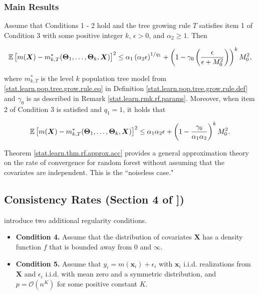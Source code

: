 \subsubsection{Main Results}

\begin{theorem}\label{stat.learn.thm.rf.approx.acc}

Assume that Conditions 1 - 2 hold and the tree growing rule \(T\) satisfies item 1 of Condition 3 with some positive integer \(k\), \(\epsilon >0\), and \(\alpha_2 \geq 1\). Then

\[
\mathbb{E}\left[ m(\boldsymbol{X}) - m_{k, T}^*(\boldsymbol{\Theta}_1, \ldots, \boldsymbol{\Theta}_k, \boldsymbol{X}) \right]^2 \leq \alpha_1 \left(\alpha_2 \epsilon\right)^{1/q_1} + \left(1 - \gamma_0 \left( \frac{\epsilon}{\epsilon  + M_0^2}\right) \right)^k M_0^2,
\]

where \(m_{k, T}^*\) is the level \(k\) population tree model from \eqref{stat.learn.pop.tree.grow.rule.eq} in Definition \ref{stat.learn.pop.tree.grow.rule.def} and \(\gamma_0\) is as described in Remark \ref{stat.learn.rmk.rf.params}. Moreover, when item 2 of Condition 3 is satisfied and \(q_1 = 1\), it holds that

\[
\mathbb{E}\left[ m(\boldsymbol{X}) - m_{k, T}^*(\boldsymbol{\Theta}_1, \ldots, \boldsymbol{\Theta}_k, \boldsymbol{X}) \right]^2 \leq \alpha_1 \alpha_2 \epsilon  + \left(1 - \frac{\gamma_0}{\alpha_1 \alpha_2}  \right)^k M_0^2.
\]

\end{theorem}

Theorem \ref{stat.learn.thm.rf.approx.acc} provides a general approximation theory on the rate of convergence for random forest without assuming that the covariates are independent. This is the ``noiseless case."

\subsection{Consistency Rates (Section 4 of \citet{Chi2020}])}

\citeauthor{Chi2020} introduce two additional regularity conditions.

\begin{itemize}

\item \textbf{Condition 4.} Assume that the distribution of covariates \(\boldsymbol{X}\) has a density function \(f\) that is bounded away from 0 and \(\infty\).

\item \textbf{Condition 5.} Assume that \(y_i = m(\boldsymbol{x}_i) + \epsilon_i\) with \(\boldsymbol{x}_i\) i.i.d. realizations from \(\boldsymbol{X}\) and \(\epsilon_i\) i.i.d. with mean zero and a symmetric distribution, and \(p = \mathcal{O}(n^K)\) for some positive constant \(K\).

\end{itemize}

